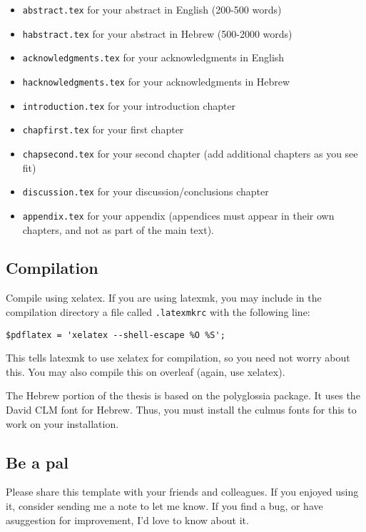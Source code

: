 \begin{enumerate}
    \begin{itemize}
        \item \verb"abstract.tex"         for your abstract in English (200-500 words)
        \item \verb"habstract.tex"        for your abstract in Hebrew (500-2000 words)
        \item \verb"acknowledgments.tex"  for your acknowledgments in English
        \item \verb"hacknowledgments.tex" for your acknowledgments in Hebrew
        \item \verb"introduction.tex"     for your introduction chapter
        \item \verb"chapfirst.tex"        for your first chapter 
        \item \verb"chapsecond.tex"       for your second chapter (add additional chapters as you see fit)
        \item \verb"discussion.tex"       for your discussion/conclusions chapter
        \item \verb"appendix.tex"         for your appendix (appendices must appear in their own chapters, and not as part of the main text). 
   \end{itemize}
   \end{enumerate}

   \subsection{Compilation}
Compile using xelatex. If you are using latexmk, you may include in the compilation directory a file called \verb".latexmkrc"
with the following line: 

\verb"$pdflatex = 'xelatex --shell-escape %O %S';"

This tells latexmk to use xelatex for compilation, so you need not worry
about this.
You may also compile this on overleaf (again, use xelatex). 

The Hebrew portion of the thesis is based on the polyglossia package. It uses the David CLM font for Hebrew. Thus, you must install the culmus fonts
for this to work on your installation. 

\subsection{ Be a pal}
Please share this template with your friends and colleagues. 
If you enjoyed using it, consider sending me a note to let me know. 
If you find a bug, or have asuggestion for improvement, I'd love to know about it.

